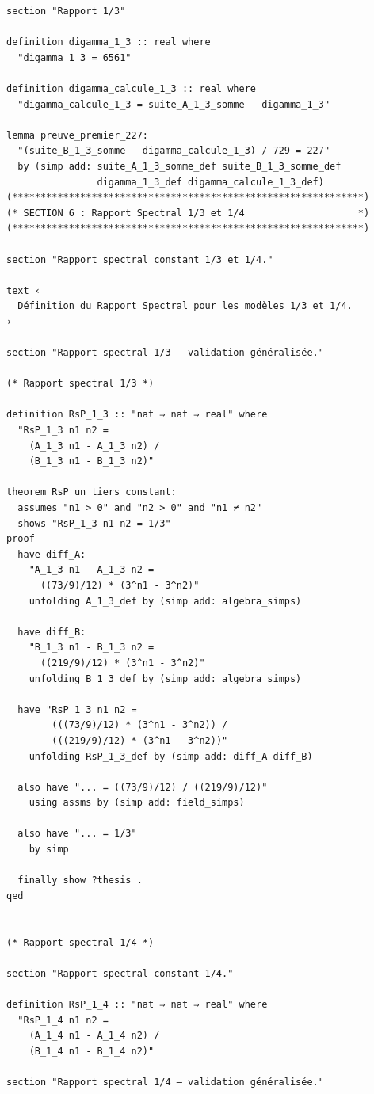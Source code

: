 \documentclass[a4paper,11pt]{article}
\begin{document}
\begin{holcode}[title={\textcolor{white}{File: methode\_spectral.thy -- Part 1/4}}]
\begin{lstlisting}
section "Rapport 1/3"

definition digamma_1_3 :: real where
  "digamma_1_3 = 6561"

definition digamma_calcule_1_3 :: real where
  "digamma_calcule_1_3 = suite_A_1_3_somme - digamma_1_3"

lemma preuve_premier_227:
  "(suite_B_1_3_somme - digamma_calcule_1_3) / 729 = 227"
  by (simp add: suite_A_1_3_somme_def suite_B_1_3_somme_def
                digamma_1_3_def digamma_calcule_1_3_def)
(**************************************************************)
(* SECTION 6 : Rapport Spectral 1/3 et 1/4                    *)
(**************************************************************)

section "Rapport spectral constant 1/3 et 1/4."

text ‹
  Définition du Rapport Spectral pour les modèles 1/3 et 1/4.
›

section "Rapport spectral 1/3 – validation généralisée."

(* Rapport spectral 1/3 *)

definition RsP_1_3 :: "nat ⇒ nat ⇒ real" where
  "RsP_1_3 n1 n2 =
    (A_1_3 n1 - A_1_3 n2) /
    (B_1_3 n1 - B_1_3 n2)"

theorem RsP_un_tiers_constant:
  assumes "n1 > 0" and "n2 > 0" and "n1 ≠ n2"
  shows "RsP_1_3 n1 n2 = 1/3"
proof -
  have diff_A:
    "A_1_3 n1 - A_1_3 n2 =
      ((73/9)/12) * (3^n1 - 3^n2)"
    unfolding A_1_3_def by (simp add: algebra_simps)

  have diff_B:
    "B_1_3 n1 - B_1_3 n2 =
      ((219/9)/12) * (3^n1 - 3^n2)"
    unfolding B_1_3_def by (simp add: algebra_simps)

  have "RsP_1_3 n1 n2 =
        (((73/9)/12) * (3^n1 - 3^n2)) /
        (((219/9)/12) * (3^n1 - 3^n2))"
    unfolding RsP_1_3_def by (simp add: diff_A diff_B)

  also have "... = ((73/9)/12) / ((219/9)/12)"
    using assms by (simp add: field_simps)

  also have "... = 1/3"
    by simp

  finally show ?thesis .
qed


(* Rapport spectral 1/4 *)

section "Rapport spectral constant 1/4."

definition RsP_1_4 :: "nat ⇒ nat ⇒ real" where
  "RsP_1_4 n1 n2 =
    (A_1_4 n1 - A_1_4 n2) /
    (B_1_4 n1 - B_1_4 n2)"

section "Rapport spectral 1/4 – validation généralisée."


\end{lstlisting}
\end{holcode}
\end{document}
